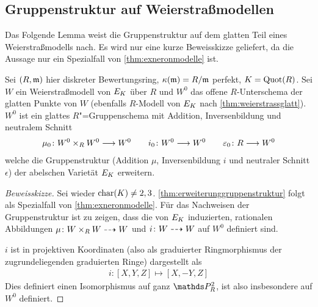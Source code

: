 \subsection{Gruppenstruktur auf Weierstraßmodellen}
Das Folgende Lemma weist die Gruppenstruktur auf dem glatten Teil
eines Weierstraßmodells nach. Es wird nur eine kurze Beweisskizze
geliefert, da die Aussage nur ein Spezialfall von
\ref{thm:exneronmodelle} ist.
\begin{Lemma}\label{thm:erweiterunggruppenstruktur}
  Sei $(R,\mathfrak{m})$ hier diskreter Bewertungsring,
  $\kappa(\mathfrak{m})=R/\mathfrak{m}$ perfekt,
  $K=\operatorname{Quot}(R)$.
  Sei $W$ ein Weierstraßmodell von $E_{K}$ über $R$ und
  $W^0$ das offene $R$-Unterschema der glatten Punkte von $W$ 
  (ebenfalls $R$-Modell von $E_{K}$ nach \ref{thm:weierstrassglatt}).
  $W^0$ ist ein glattes $R$"=Gruppenschema
  mit Addition, Inversenbildung und neutralem Schnitt
  \begin{gather*}
    \mu_0\colon W^0\times_R W^0 \longrightarrow W^0
    \qquad
    i_0\colon W^0\longrightarrow W^0
    \qquad
    \varepsilon_0\colon R\longrightarrow W^0
  \end{gather*}
  welche die Gruppenstruktur (Addition $\mu$, Inversenbildung $i$ und
  neutraler Schnitt $\epsilon$)
  der abelschen Varietät $E_{K}$ erweitern.

  
  \begin{proof}[Beweisskizze] Sei wieder $\operatorname{char}(K)\neq 2,3$.
    \ref{thm:erweiterunggruppenstruktur} folgt als Spezialfall von
    \ref{thm:exneronmodelle}.
    Für das Nachweisen der Gruppenstruktur ist zu zeigen, dass die von
    $E_{K}$ induzierten, rationalen Abbildungen $\mu\colon W\times_R
    W\dashrightarrow W$ und $i\colon W\dashrightarrow W$ auf $W^0$ definiert sind.

    $i$ ist in projektiven Koordinaten (also als graduierter
    Ringmorphismus der zugrundeliegenden graduierten Ringe)
    dargestellt als
    \begin{gather*}
      i\colon [X,Y,Z]\mapsto [X,-Y,Z]
    \end{gather*}
    Dies definiert einen Isomorphismus auf ganz $\P_R^2$, ist also
    insbesondere auf $W^0$ definiert.


\end{proof}
\end{Lemma}
